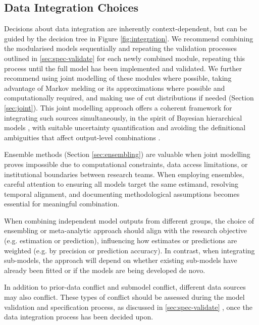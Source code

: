 \documentclass{article}
\begin{document}
\subsection{Data Integration Choices}\label{sec:integration}

Decisions about data integration are inherently context-dependent, but can be guided by the decision tree in Figure \ref{fig:integration}. We recommend combining the modularised models sequentially and repeating the validation processes outlined in \ref{sec:spec-validate} for each newly combined module, repeating this process until the full model has been implemented and validated.
We further recommend using joint modelling of these modules where possible, taking advantage of Markov melding \citep{goudie2019joining} or its approximations where possible and computationally required,  and making use of cut distributions \citep{plummer2015cuts} if needed (Section \ref{sec:joint}). 
This joint modelling approach offers a coherent framework for integrating such sources simultaneously, in the spirit of Bayesian hierarchical models \citep{gelman2020bayesian}, with suitable uncertainty quantification and avoiding the definitional ambiguities that affect output-level combinations \citep{manley2024combining, brockhaus2023why}. 

Ensemble methods (Section \ref{sec:ensembling}) are valuable when joint modelling proves impossible due to computational constraints, data access limitations, or institutional boundaries between research teams.
When employing ensembles, careful attention to ensuring all models target the same estimand, resolving temporal alignment, and documenting methodological assumptions becomes essential for meaningful combination. 

When combining independent model outputs from different groups, the choice of ensembling or meta-analytic approach should align with the research objective (e.g. estimation or prediction), influencing how estimates or predictions are weighted (e.g. by precision or prediction accuracy). In contrast, when integrating sub-models, the approach will depend on whether existing sub-models have already been fitted or if the models are being developed de novo.

In addition to prior-data conflict and submodel conflict, different data sources may also conflict. These types of conflict should be assessed during the model validation and specification process, as discussed in \ref{sec:spec-validate} \citep{presanis2013conflict,sherratt2021exploring,yang2025detecting}, once the data integration process has been decided upon.
\end{document}

